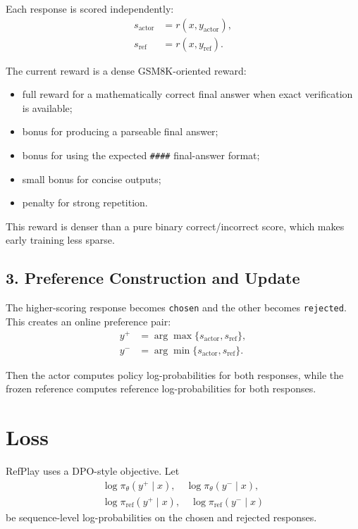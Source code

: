 \documentclass[11pt]{article}
\begin{document}
Each response is scored independently:
\begin{align*}
s_{\mathrm{actor}} &= r(x, y_{\mathrm{actor}}), \\
s_{\mathrm{ref}} &= r(x, y_{\mathrm{ref}}).
\end{align*}

The current reward is a dense GSM8K-oriented reward:
\begin{itemize}
  \item full reward for a mathematically correct final answer when exact verification is available;
  \item bonus for producing a parseable final answer;
  \item bonus for using the expected \texttt{\#\#\#\#} final-answer format;
  \item small bonus for concise outputs;
  \item penalty for strong repetition.
\end{itemize}

This reward is denser than a pure binary correct/incorrect score, which makes
early training less sparse.

\subsection*{3. Preference Construction and Update}

The higher-scoring response becomes \texttt{chosen} and the other becomes
\texttt{rejected}. This creates an online preference pair:
\begin{align*}
y^{+} &= \arg\max \{ s_{\mathrm{actor}}, s_{\mathrm{ref}} \}, \\
y^{-} &= \arg\min \{ s_{\mathrm{actor}}, s_{\mathrm{ref}} \}.
\end{align*}

Then the actor computes policy log-probabilities for both responses, while the
frozen reference computes reference log-probabilities for both responses.

\section{Loss}

RefPlay uses a DPO-style objective. Let
\begin{align*}
\log \pi_{\theta}(y^{+} \mid x), \quad
\log \pi_{\theta}(y^{-} \mid x), \\
\log \pi_{\mathrm{ref}}(y^{+} \mid x), \quad
\log \pi_{\mathrm{ref}}(y^{-} \mid x)
\end{align*}
be sequence-level log-probabilities on the chosen and rejected responses.
\end{document}
